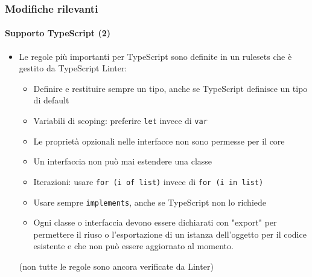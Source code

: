 \begin{frame}[fragile]
	\frametitle{Modifiche rilevanti}
	\framesubtitle{Supporto TypeScript (2)}

	\begin{itemize}
		\item Le regole più importanti per TypeScript sono definite in un rulesets che è gestito da TypeScript Linter:

			\begin{itemize}
				\item Definire e restituire sempre un tipo, anche se TypeScript definisce un tipo di default
				\item Variabili di scoping: preferire \texttt{let} invece di \texttt{var}
				\item Le proprietà opzionali nelle interfacce non sono permesse per il core
				\item Un interfaccia non può mai estendere una classe
				\item Iterazioni: usare \texttt{for (i of list)} invece di \texttt{for (i in list)}
				\item Usare sempre \texttt{implements}, anche se TypeScript non lo richiede
				\item Ogni classe o interfaccia devono essere dichiarati con "export" per permettere il riuso o l'esportazione di un istanza dell'oggetto per il codice esistente e che non può essere aggiornato al momento.
			\end{itemize}

			\small(non tutte le regole sono ancora verificate da Linter)\normalsize

	\end{itemize}

\end{frame}


